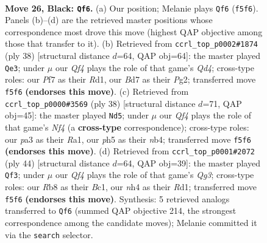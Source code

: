 \documentclass[11pt]{article}
\begin{document}
\clearpage

\begin{figure}[p]\centering
\begin{subfigure}{0.46\textwidth}\centering
\resizebox{\linewidth}{!}{%
\newchessgame
\chessboard[
  setfen={1rr3k1/1p1b1ppp/2n1p3/2Pp1q1P/p2P3N/P1P5/R2QBPP1/2R2K2 b - - 10 26},
  showmover=false,
  pgfstyle=straightmove, color=movearrow, markmove={f5-f6}
]}
\caption{}
\end{subfigure}\hfill
\begin{subfigure}{0.46\textwidth}\centering
\resizebox{\linewidth}{!}{%
\newchessgame
\chessboard[
  setfen={r3r1k1/1q1n1ppp/1ppp1b2/p7/2PQP3/P1N3BP/1P3PP1/3R1RK1 w - - 1 20},
  showmover=false,
  pgfstyle=straightmove, color=movearrow, markmove={d4-e3}
]}
\caption{}
\end{subfigure}
\\[4pt]
\begin{subfigure}{0.46\textwidth}\centering
\resizebox{\linewidth}{!}{%
\newchessgame
\chessboard[
  setfen={r2qr1k1/1p3p1p/3p2p1/p3b3/Pn1pPNP1/1Q1P2P1/1P3P2/R1B2RK1 w - - 1 20},
  showmover=false,
  pgfstyle=straightmove, color=movearrow, markmove={f4-d5}
]}
\caption{}
\end{subfigure}\hfill
\begin{subfigure}{0.46\textwidth}\centering
\resizebox{\linewidth}{!}{%
\newchessgame
\chessboard[
  setfen={4rbk1/p1nr1qpp/2p2p2/P1p1p3/8/2PPN1Q1/1P3PPP/2BRR1K1 w - - 9 23},
  showmover=false,
  pgfstyle=straightmove, color=movearrow, markmove={g3-f3}
]}
\caption{}
\end{subfigure}
\caption{\textbf{Move 26, Black: \texttt{Qf6}.} (a) Our position; Melanie plays \texttt{Qf6} (\texttt{f5f6}). Panels (b)--(d) are the retrieved master positions whose correspondence most drove this move (highest QAP objective among those that transfer to it). (b) Retrieved from \texttt{ccrl\_top\_p0002\#1874} (ply 38) [structural distance $d$=64, QAP obj=64]: the master played \texttt{Qe3}; under $\mu$ our \emph{Qf4} plays the role of that game's \emph{Qd4}; cross-type roles: our \emph{P}f7 as their \emph{R}d1, our \emph{B}d7 as their \emph{P}g2; transferred move \texttt{f5f6} \textbf{(endorses this move)}. (c) Retrieved from \texttt{ccrl\_top\_p0000\#3569} (ply 38) [structural distance $d$=71, QAP obj=45]: the master played \texttt{Nd5}; under $\mu$ our \emph{Qf4} plays the role of that game's \emph{Nf4} (a \textbf{cross-type} correspondence); cross-type roles: our \emph{p}a3 as their \emph{R}a1, our \emph{p}h5 as their \emph{n}b4; transferred move \texttt{f5f6} \textbf{(endorses this move)}. (d) Retrieved from \texttt{ccrl\_top\_p0001\#2072} (ply 44) [structural distance $d$=64, QAP obj=39]: the master played \texttt{Qf3}; under $\mu$ our \emph{Qf4} plays the role of that game's \emph{Qg3}; cross-type roles: our \emph{R}b8 as their \emph{B}c1, our \emph{n}h4 as their \emph{R}d1; transferred move \texttt{f5f6} \textbf{(endorses this move)}. Synthesis: 5 retrieved analogs transferred to \texttt{Qf6} (summed QAP objective 214, the strongest correspondence among the candidate moves); Melanie committed it via the \texttt{search} selector.}
\label{fig:thought-m51}
\end{figure}
\end{document}
